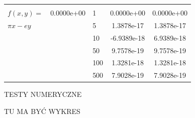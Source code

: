 \documentclass[9pt]{beamer}
\begin{document}
\begin{frame}
\begin{table}[]
{\begin{tabular}{|l|S|l|S|S|}
				\hline & & & &\\[-1em]
$ f(x,y) = $                 &  0.0000e+00 & 1   &  0.0000e+00 & 0.0000e+00 \\%
$ \pi x - ey $               &             & 5   &  1.3878e-17 & 1.3878e-17 \\%
                             &             & 10  & -6.9389e-18 & 6.9389e-18 \\%
                             &             & 50  &  9.7578e-19 & 9.7578e-19 \\%
                             &             & 100 &  1.3281e-18 & 1.3281e-18 \\%
                             &             & 500 &  7.9028e-19 & 7.9028e-19 \\%

				\hline
			\end{tabular}
		}
	\end{table}
\end{frame}

\begin{frame}
    TESTY NUMERYCZNE
\end{frame}


\begin{frame}
    TU MA BYĆ WYKRES
\end{frame}
\end{document}
